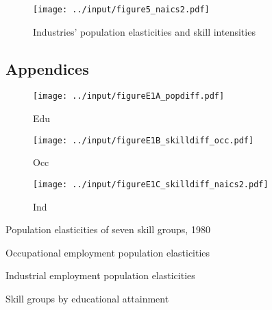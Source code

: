 \documentclass[11pt]{article}
\begin{document}
\begin{figure} \caption{Industries' population elasticities and skill intensities} \begin{center}
\texttt{[image: ../input/figure5\_naics2.pdf]}
\label{fig:ind_popelast}
\end{center}\end{figure}



\pagebreak

\subsection{Appendices}

\begin{figure} \caption{Edu} \begin{center}
\texttt{[image: ../input/figureE1A\_popdiff.pdf]}
\label{fig:edu}
\end{center}\end{figure}

\begin{figure} \caption{Occ} \begin{center}
\texttt{[image: ../input/figureE1B\_skilldiff\_occ.pdf]}
\label{fig:occ}
\end{center}\end{figure}

\begin{figure} \caption{Ind} \begin{center}
\texttt{[image: ../input/figureE1C\_skilldiff\_naics2.pdf]}
\label{fig:naics}
\end{center}\end{figure}


\begin{table} \caption{Population elasticities of seven skill groups, 1980}

\label{tab:E1}
\end{table}

\begin{table} \caption{Occupational employment population elasticities}
\resizebox{\textwidth}{!}{

}
\label{tab:E2}
\end{table}

\begin{table} \caption{Industrial employment population elasticities}
\resizebox{\textwidth}{!}{

}
\label{tab:E3}
\end{table}

\begin{table} \caption{Skill groups by educational attainment}
\resizebox{\textwidth}{!}{}
\label{tab:E4}
\end{table}
\end{document}

